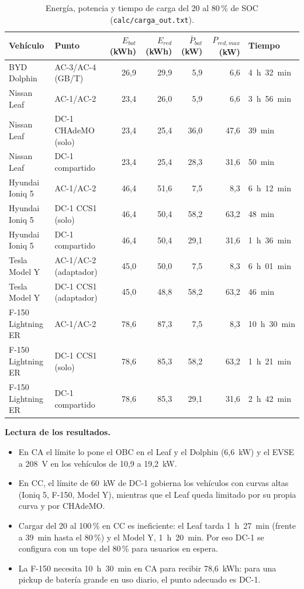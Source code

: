 \begin{table}[H]
\centering\small
\caption{Energía, potencia y tiempo de carga del 20 al 80\,\% de SOC (\texttt{calc/carga\_out.txt}).}\label{tab:tiempos}
\begin{tabularx}{\textwidth}{L{3.6cm}L{3.7cm}rrrrY}
\toprule
\textbf{Vehículo} & \textbf{Punto} & \textbf{$E_{bat}$ (kWh)} & \textbf{$E_{red}$ (kWh)} & \textbf{$\bar P_{bat}$ (kW)} & \textbf{$P_{red,max}$ (kW)} & \textbf{Tiempo}\\
\midrule
BYD Dolphin & AC-3/AC-4 (GB/T) & 26,9 & 29,9 & 5,9 & 6,6 & 4~h~32~min\\
Nissan Leaf & AC-1/AC-2 & 23,4 & 26,0 & 5,9 & 6,6 & 3~h~56~min\\
Nissan Leaf & DC-1 CHAdeMO (solo) & 23,4 & 25,4 & 36,0 & 47,6 & 39~min\\
Nissan Leaf & DC-1 compartido & 23,4 & 25,4 & 28,3 & 31,6 & 50~min\\
Hyundai Ioniq 5 & AC-1/AC-2 & 46,4 & 51,6 & 7,5 & 8,3 & 6~h~12~min\\
Hyundai Ioniq 5 & DC-1 CCS1 (solo) & 46,4 & 50,4 & 58,2 & 63,2 & 48~min\\
Hyundai Ioniq 5 & DC-1 compartido & 46,4 & 50,4 & 29,1 & 31,6 & 1~h~36~min\\
Tesla Model Y & AC-1/AC-2 (adaptador) & 45,0 & 50,0 & 7,5 & 8,3 & 6~h~01~min\\
Tesla Model Y & DC-1 CCS1 (adaptador) & 45,0 & 48,8 & 58,2 & 63,2 & 46~min\\
F-150 Lightning ER & AC-1/AC-2 & 78,6 & 87,3 & 7,5 & 8,3 & 10~h~30~min\\
F-150 Lightning ER & DC-1 CCS1 (solo) & 78,6 & 85,3 & 58,2 & 63,2 & 1~h~21~min\\
F-150 Lightning ER & DC-1 compartido & 78,6 & 85,3 & 29,1 & 31,6 & 2~h~42~min\\
\bottomrule
\end{tabularx}
\end{table}

\textbf{Lectura de los resultados.}
\begin{itemize}
\item En CA el límite lo pone el OBC en el Leaf y el Dolphin (6,6~kW) y el EVSE a 208~V en los vehículos de 10,9 a 19,2~kW.
\item En CC, el límite de 60~kW de DC-1 gobierna los vehículos con curvas altas (Ioniq 5, F-150, Model Y), mientras que el Leaf queda limitado por su propia curva y por CHAdeMO.
\item Cargar del 20 al 100\,\% en CC es ineficiente: el Leaf tarda 1~h~27~min (frente a 39~min hasta el 80\,\%) y el Model Y, 1~h~20~min. Por eso DC-1 se configura con un tope del 80\,\% para usuarios en espera.
\item La F-150 necesita 10~h~30~min en CA para recibir 78,6~kWh: para una pickup de batería grande en uso diario, el punto adecuado es DC-1.
\end{itemize}

